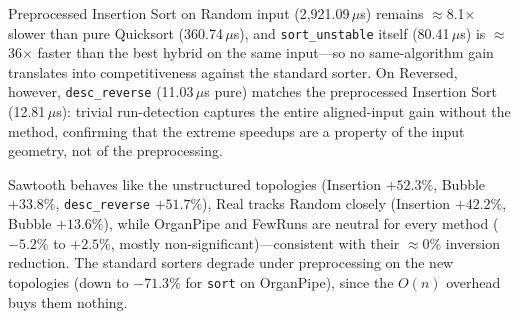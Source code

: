 \documentclass[namedate,webpdf,contemporary,large]{TBench-template}%
\theoremstyle{thmstyleone}%
\theoremstyle{thmstyletwo}%
\theoremstyle{thmstylethree}%
\begin{document}

\begin{table}[!t]
\caption{Mean time per execution (in $\mu$s, mean $\pm$ 95\% CI half-width) and preprocessing gain for 10,000-element vectors. Source: Criterion, seed 42. Gain marked $^{*}$ when the paired bootstrap 95\% CI excludes zero (seed 42) and $^{\dagger}$ when additionally sign-stable across all five pools.\label{tab:times}}%

\end{table}

\begin{table}[!t]
\caption{Competitive baselines: mean time per execution (in $\mu$s, mean $\pm$ 95\% CI half-width) and preprocessing gain for 10,000-element vectors. \texttt{sort\_unstable} and \texttt{sort} are the Rust standard-library sorters; \texttt{desc\_reverse} is Insertion Sort preceded by $O(n)$ descending-run detection with reversal. Same significance marks as Table~\ref{tab:times}.\label{tab:baselines}}%

\end{table}

Preprocessed Insertion Sort on Random input (2,921.09\,$\mu$s) remains $\approx$8.1$\times$ slower than pure Quicksort (360.74\,$\mu$s), and \texttt{sort\_unstable} itself (80.41\,$\mu$s) is $\approx$36$\times$ faster than the best hybrid on the same input---so no same-algorithm gain translates into competitiveness against the standard sorter. On Reversed, however, \texttt{desc\_reverse} (11.03\,$\mu$s pure) matches the preprocessed Insertion Sort (12.81\,$\mu$s): trivial run-detection captures the entire aligned-input gain without the method, confirming that the extreme speedups are a property of the input geometry, not of the preprocessing.

\begin{table}[!t]
\caption{New topologies: mean time per execution (in $\mu$s, mean $\pm$ 95\% CI half-width) and preprocessing gain for 10,000-element vectors, all eight methods. Same significance marks as Table~\ref{tab:times}.\label{tab:newtypes}}%

\end{table}

Sawtooth behaves like the unstructured topologies (Insertion $+52.3\%$, Bubble $+33.8\%$, \texttt{desc\_reverse} $+51.7\%$), Real tracks Random closely (Insertion $+42.2\%$, Bubble $+13.6\%$), while OrganPipe and FewRuns are neutral for every method ($-5.2\%$ to $+2.5\%$, mostly non-significant)---consistent with their $\approx$0\% inversion reduction. The standard sorters degrade under preprocessing on the new topologies (down to $-71.3\%$ for \texttt{sort} on OrganPipe), since the $O(n)$ overhead buys them nothing.
\end{document}
